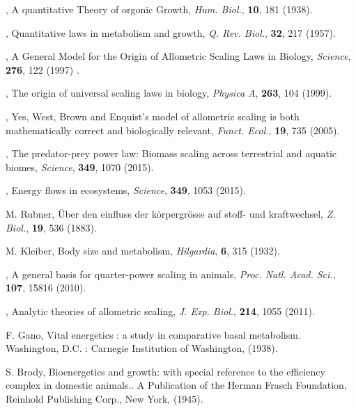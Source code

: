 \documentclass[12pt]{iopart}
\begin{document}
%
\begin{thebibliography}{100}

, {A quantitative Theory of orgonic Growth}, \textit{Hum. Biol.}, \textbf{10}, {181} {(1938)}.

, {Quantitative laws in metabolism and growth}, \textit{Q. Rev. Biol.}, \textbf{32}, {217} {(1957)}.

, {A General Model for the Origin of Allometric Scaling Laws in Biology}, \textit{Science}, \textbf{276}, {122} {(1997)} .

, { The origin of universal scaling laws in biology}, \textit{Physica A}, \textbf{263}, {104} {(1999)}.

, {Yes, West, Brown and Enquist's model of allometric scaling is both mathematically correct and biologically relevant}, \textit{Funct. Ecol.}, \textbf{19}, 735 {(2005)}.

, {The predator-prey power law: Biomass scaling across terrestrial and aquatic biomes}, \textit{Science}, \textbf{349}, {1070} {(2015)}.

, {Energy flows in ecosystems}, \textit{Science}, \textbf{349},  {1053} {(2015)}.

 M. Rubner, {{\"{U}}ber den einfluss der k{\"{o}}rpergr{\"{o}}sse auf stoff- und kraftwechsel}, \textit{Z. Biol.}, \textbf{19},  536 (1883).

 M. Kleiber, {Body size and metabolism}, \textit{Hilgardia}, \textbf{6}, 315 (1932).

, {A general basis for quarter-power scaling in animals}, \textit{Proc. Natl. Acad. Sci.}, \textbf{107}, {15816} {(2010)}.

, {Analytic theories of allometric scaling}, \textit{J. Exp. Biol.}, \textbf{214}, 1055 {(2011)}.

 {F. Gano}, {Vital energetics : a study in comparative basal metabolism}. {Washington, D.C. : Carnegie Institution of Washington}, {(1938)}.

 S. Brody, {Bioenergetics and growth: with special reference to the efficiency complex in domestic animals.}. A Publication of the Herman Frasch Foundation, Reinhold Publishing Corp., New York, (1945).


\end{thebibliography}
\end{document}
